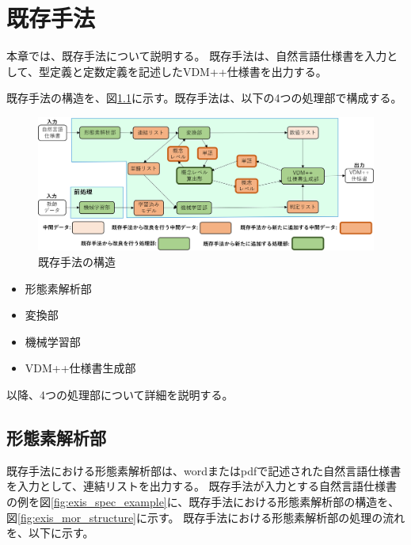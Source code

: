 \chapter{既存手法}\label{cha:Function}

本章では、既存手法について説明する。
既存手法は、自然言語仕様書を入力として、型定義と定数定義を記述したVDM++仕様書を出力する。

既存手法の構造を、図\ref{fig:exis_structure}に示す。既存手法は、以下の4つの処理部で構成する。

\begin{figure}[tp]
    \begin{center}
        \includegraphics[width=1.0\columnwidth]{image/vgml_structure.png}
        \caption{既存手法の構造}
        \label{fig:exis_structure}
    \end{center}
\end{figure}

\begin{itemize}
    \item 形態素解析部
    \item 変換部
    \item 機械学習部
    \item VDM++仕様書生成部
\end{itemize}

以降、4つの処理部について詳細を説明する。

\section{形態素解析部}
既存手法における形態素解析部は、wordまたはpdfで記述された自然言語仕様書を入力として、連結リストを出力する。
既存手法が入力とする自然言語仕様書の例を図\ref{fig:exis_spec_example}に、既存手法における形態素解析部の構造を、図\ref{fig:exis_mor_structure}に示す。
既存手法における形態素解析部の処理の流れを、以下に示す。

